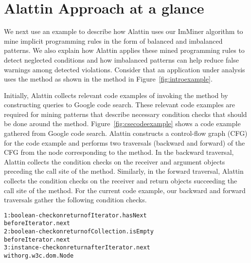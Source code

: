 \section{Alattin Approach at a glance}
\label{sec:example}

We next use an example to describe how Alattin uses our ImMiner algorithm
to mine implicit programming rules in the form of balanced and imbalanced patterns.
We also explain how Alattin applies these mined programming rules to detect neglected conditions
and how imbalanced patterns can help reduce false warnings among detected violations.
Consider that an application under analysis uses the  method as shown in the  method in Figure~\ref{fig:introexample}. 

Initially, Alattin collects relevant code examples of invoking the 
method by constructing queries to Google code search. These relevant code examples
are required for mining patterns that describe necessary 
condition checks that should be done around the  method.
Figure~\ref{fig:csecodeexample} shows a code example gathered from Google code search.
Alattin constructs a control-flow graph (CFG) for the code example
and performs two traversals (backward and forward) of the CFG
from the node corresponding to the  method. In the backward traversal,
Alattin collects the condition checks on the receiver and 
argument objects preceding the call site of the  method.
Similarly, in the forward traversal, Alattin collects
the condition checks on the receiver and return objects 
succeeding the call site of the  method.
For the current code example, our backward and forward traversals gather
the following condition checks.

\begin{CodeOut}
\begin{alltt}
\hspace*{0.1in}1: boolean-check on return of Iterator.hasNext 
\hspace*{0.5in}before Iterator.next 
\hspace*{0.1in}2: boolean-check on return of Collection.isEmpty 
\hspace*{0.5in}before Iterator.next 
\hspace*{0.1in}3: instance-check on return after Iterator.next 
\hspace*{0.5in}with org.w3c.dom.Node
\end{alltt}
\end{CodeOut}

